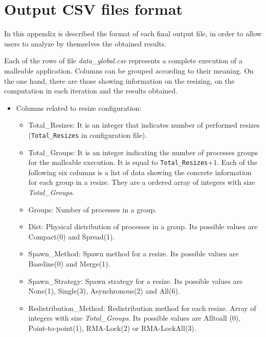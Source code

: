 \section{Output CSV files format}
\label{appendix:csv}

In this appendix is described the format of each final output file, in order to allow users to analyze by themselves the obtained results.

Each of the rows of file \textit{data\_global.csv} represents a complete execution of a malleable application. Columns can be grouped according to their meaning. On the one hand, there are those showing information on the resizing, on the computation in each iteration and the results obtained.
\begin{itemize}
    \item Columns related to resize configuration:
    \begin{itemize}
        \item Total\_Resizes: It is an integer that indicates number of performed resizes (\texttt{Total\_Resizes} in configuration file). %
        \item Total\_Groups: It is an integer indicating the number of processes groups for the malleable execution. It is equal to \texttt{Total\_Resizes}$+1$.%
        Each of the following six columns is a list of data showing the concrete information for each group in a resize. They are a ordered array of integers with size \textit{Total\_Groups}.  
        \item Groups: Number of processes in a group. %
        \item Dist: Physical distribution of processes in a group. %
        Its possible values are Compact(0) and Spread(1).
        \item Spawn\_Method: Spawn method for a resize.%
        Its possible values are Baseline(0) and Merge(1).
        \item Spawn\_Strategy: Spawn strategy for a resize. %
        Its possible values are None(1), Single(3), Asynchronous(2) and All(6).
        \item Redistribution\_Method: Redistribution method for each resize. Array of integers with size \textit{Total\_Groups}. Its possible values are Alltoall (0), Point-to-point(1), RMA-Lock(2) or RMA-LockAll(3).

\end{itemize}
\end{itemize}
